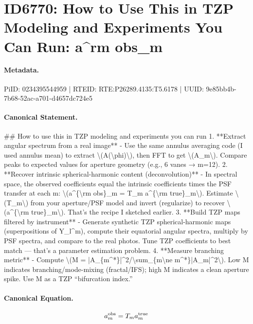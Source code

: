 \section*{ID6770: How to Use This in TZP Modeling and Experiments You Can Run: a\textasciicircum{}rm obs\_m}
\paragraph{Metadata.}
PiID: 0234395544959 | RTEID: RTE:P26289.4135:T5.6178 | UUID: 9e85bb4b-7b68-52ac-a701-d4657dc724e5

\paragraph{Canonical Statement.}
\#\# How to use this in TZP modeling and experiments you can run 1. **Extract angular spectrum from a real image** - Use the same annulus averaging code (I used annulus mean) to extract \textbackslash{}(A(\textbackslash{}phi)\textbackslash{}), then FFT to get \textbackslash{}(A\_m\textbackslash{}). Compare peaks to expected values for aperture geometry (e.g., 6 vanes → m=12). 2. **Recover intrinsic spherical-harmonic content (deconvolution)** - In spectral space, the observed coefficients equal the intrinsic coefficients times the PSF transfer at each m: \textbackslash{}(a\textasciicircum{}\{\textbackslash{}rm obs\}\_m = T\_m a\textasciicircum{}\{\textbackslash{}rm true\}\_m\textbackslash{}). Estimate \textbackslash{}(T\_m\textbackslash{}) from your aperture/PSF model and invert (regularize) to recover \textbackslash{}(a\textasciicircum{}\{\textbackslash{}rm true\}\_m\textbackslash{}). That’s the recipe I sketched earlier. 3. **Build TZP maps filtered by instrument** - Generate synthetic TZP spherical-harmonic maps (superpositions of Y\_l\textasciicircum{}m), compute their equatorial angular spectra, multiply by PSF spectra, and compare to the real photos. Tune TZP coefficients to best match — that’s a parameter estimation problem. 4. **Measure branching metric** - Compute \textbackslash{}(M = |A\_\{m\textasciicircum{}*\}|\textasciicircum{}2/\textbackslash{}sum\_\{m\textbackslash{}ne m\textasciicircum{}*\}|A\_m|\textasciicircum{}2\textbackslash{}). Low M indicates branching/mode-mixing (fractal/IFS); high M indicates a clean aperture spike. Use M as a TZP “bifurcation index.”

\paragraph{Canonical Equation.}
\[
a^{\rm obs}_m = T_m a^{\rm true}_m
\]

